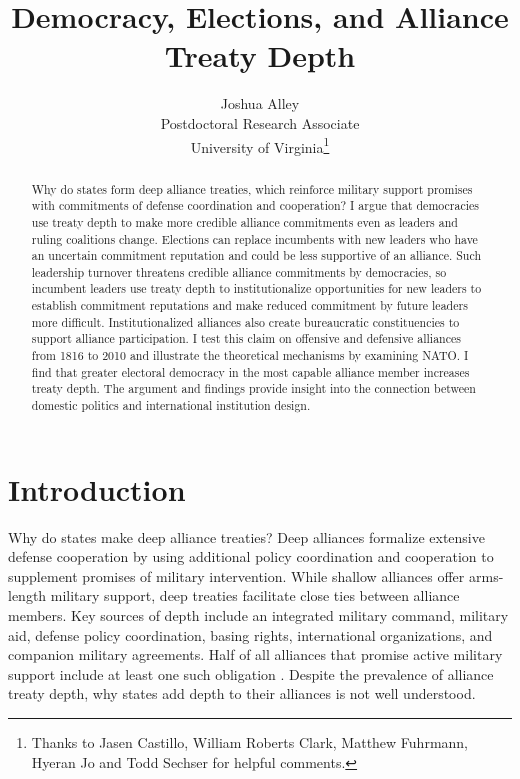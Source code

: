 \documentclass[12pt]{article}
\title{\textbf{Democracy, Elections, and Alliance Treaty Depth}}
\author{Joshua Alley \\
Postdoctoral Research Associate \\
University of Virginia\thanks{Thanks to Jasen Castillo, William Roberts Clark, Matthew Fuhrmann, Hyeran Jo and Todd Sechser for helpful comments.} 
}
\date{}
\begin{document}
\maketitle 

\doublespace 

\begin{abstract}
Why do states form deep alliance treaties, which reinforce military support promises with commitments of defense coordination and cooperation? 
I argue that democracies use treaty depth to make more credible alliance commitments even as leaders and ruling coalitions change. 
Elections can replace incumbents with new leaders who have an uncertain commitment reputation and could be less supportive of an alliance. 
Such leadership turnover threatens credible alliance commitments by democracies, so incumbent leaders use treaty depth to institutionalize opportunities for new leaders to establish commitment reputations and make reduced commitment by future leaders more difficult. 
Institutionalized alliances also create bureaucratic constituencies to support alliance participation.
I test this claim on offensive and defensive alliances from 1816 to 2010 and illustrate the theoretical mechanisms by examining NATO.
I find that greater electoral democracy in the most capable alliance member increases treaty depth. 
The argument and findings provide insight into the connection between domestic politics and international institution design. 
\end{abstract}


\newpage 


\section{Introduction}


Why do states make deep alliance treaties? 
Deep alliances formalize extensive defense cooperation by using additional policy coordination and cooperation to supplement promises of military intervention. 
While shallow alliances offer arms-length military support, deep treaties facilitate close ties between alliance members. 
Key sources of depth include an integrated military command, military aid, defense policy coordination, basing rights, international organizations, and companion military agreements.
Half of all alliances that promise active military support include at least one such obligation \citep{Leedsetal2002}. 
Despite the prevalence of alliance treaty depth, why states add depth to their alliances is not well understood. 
\end{document}
